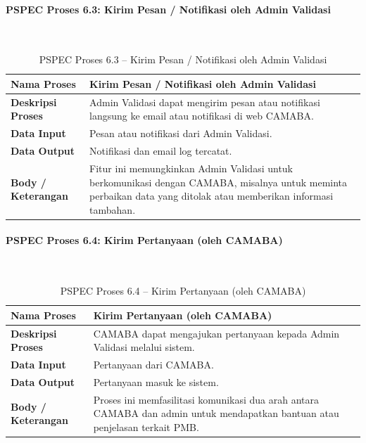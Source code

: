 \paragraph{PSPEC Proses 6.3: Kirim Pesan / Notifikasi oleh Admin Validasi}~\\
\begin{longtable}{|p{}|p{}|}
	\caption{PSPEC Proses 6.3 -- Kirim Pesan / Notifikasi oleh Admin Validasi}
	\label{table:3.pspec63}\\
	\hline
	\textbf{Nama Proses} & Kirim Pesan / Notifikasi oleh Admin Validasi \\
	\hline
	\textbf{Deskripsi Proses} & Admin Validasi dapat mengirim pesan atau notifikasi langsung ke email atau notifikasi di web CAMABA. \\
	\hline
	\textbf{Data Input} & Pesan atau notifikasi dari Admin Validasi. \\
	\hline
	\textbf{Data Output} & Notifikasi dan email log tercatat. \\
	\hline
	\textbf{Body / Keterangan} & Fitur ini memungkinkan Admin Validasi untuk berkomunikasi dengan CAMABA, misalnya untuk meminta perbaikan data yang ditolak atau memberikan informasi tambahan. \\
	\hline
\end{longtable}

\paragraph{PSPEC Proses 6.4: Kirim Pertanyaan (oleh CAMABA)}~\\
\begin{longtable}{|p{}|p{}|}
	\caption{PSPEC Proses 6.4 -- Kirim Pertanyaan (oleh CAMABA)}
	\label{table:3.pspec64}\\
	\hline
	\textbf{Nama Proses} & Kirim Pertanyaan (oleh CAMABA) \\
	\hline
	\textbf{Deskripsi Proses} & CAMABA dapat mengajukan pertanyaan kepada Admin Validasi melalui sistem. \\
	\hline
	\textbf{Data Input} & Pertanyaan dari CAMABA. \\
	\hline
	\textbf{Data Output} & Pertanyaan masuk ke sistem. \\
	\hline
	\textbf{Body / Keterangan} & Proses ini memfasilitasi komunikasi dua arah antara CAMABA dan admin untuk mendapatkan bantuan atau penjelasan terkait PMB. \\
	\hline
\end{longtable}

